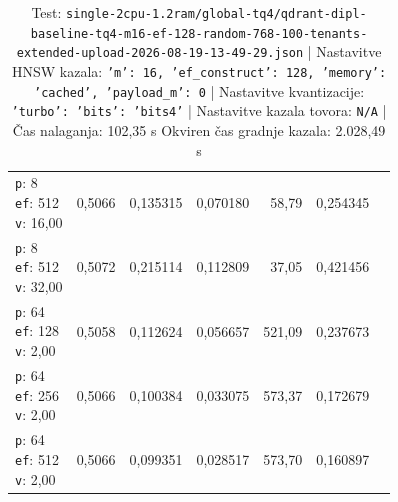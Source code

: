 \begin{table}[htbp]
\begin{tabularx}{\textwidth}{Xrrrrrr}
    \makecell{\texttt{p}: 8\\\texttt{ef}: 512\\\texttt{v}: 16,00} & 0,5066 & 0,135315 & 0,070180 & 58,79 & 0,254345 \\
    \makecell{\texttt{p}: 8\\\texttt{ef}: 512\\\texttt{v}: 32,00} & 0,5072 & 0,215114 & 0,112809 & 37,05 & 0,421456 \\
    \makecell{\texttt{p}: 64\\\texttt{ef}: 128\\\texttt{v}: 2,00} & 0,5058 & 0,112624 & 0,056657 & 521,09 & 0,237673 \\
    \makecell{\texttt{p}: 64\\\texttt{ef}: 256\\\texttt{v}: 2,00} & 0,5066 & 0,100384 & 0,033075 & 573,37 & 0,172679 \\
    \makecell{\texttt{p}: 64\\\texttt{ef}: 512\\\texttt{v}: 2,00} & 0,5066 & 0,099351 & 0,028517 & 573,70 & 0,160897 \\
    \bottomrule
  \end{tabularx}
\caption* {Test: \texttt{single-2cpu-1.2ram/global-tq4/qdrant-dipl-baseline-tq4-m16-ef-128-random-768-100-tenants-extended-upload-2026-08-19-13-49-29.json} | Nastavitve HNSW kazala: \texttt{{'m': 16, 'ef\_construct': 128, 'memory': 'cached', 'payload\_m': 0}} | Nastavitve kvantizacije: \texttt{{'turbo': {'bits': 'bits4'}}} | Nastavitve kazala tovora: \texttt{N/A} | Čas nalaganja: 102,35 s Okviren čas gradnje kazala: 2.028,49 s}\end{table}


